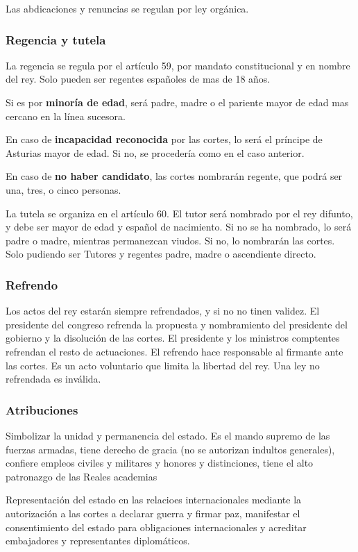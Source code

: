         Las abdicaciones y renuncias se regulan por ley orgánica.
    
    \subsubsection{Regencia y tutela}
        La regencia se regula por el artículo 59, por mandato constitucional y en nombre del rey. Solo pueden ser regentes españoles de mas de 18 años. 
        
        Si es por \textbf{minoría de edad}, será padre, madre o el pariente mayor de edad mas cercano en la línea sucesora.

        En caso de \textbf{incapacidad reconocida} por las cortes, lo será el príncipe de Asturias mayor de edad. Si no, se procedería como en el caso anterior.

        En caso de \textbf{no haber candidato}, las cortes nombrarán regente, que podrá ser una, tres, o cinco personas.
    
        La tutela se organiza en el artículo 60. El tutor será nombrado por el rey difunto, y debe ser mayor de edad y español de nacimiento. Si no se ha nombrado, lo será padre o madre, mientras permanezcan viudos. Si no, lo nombrarán las cortes. Solo pudiendo ser Tutores y regentes padre, madre o ascendiente directo.
    
    \subsubsection{Refrendo}
        Los actos del rey estarán siempre refrendados, y si no no tinen validez. El presidente del congreso refrenda la propuesta y nombramiento del presidente del gobierno y la disolución de las cortes. El presidente y los ministros comptentes refrendan el resto de actuaciones. El refrendo hace responsable al firmante ante las cortes. Es un acto voluntario que limita la libertad del rey. Una ley no refrendada es inválida.

    \subsubsection{Atribuciones}
        Simbolizar la unidad y permanencia del estado. Es el mando supremo de las fuerzas armadas, tiene derecho de gracia (no se autorizan indultos generales), confiere empleos civiles y militares y honores y distinciones, tiene el alto patronazgo de las Reales academias

        Representación del estado en las relacioes internacionales mediante la autorización a las cortes a declarar guerra y firmar paz, manifestar el consentimiento del estado para obligaciones internacionales y acreditar embajadores y representantes diplomáticos.

